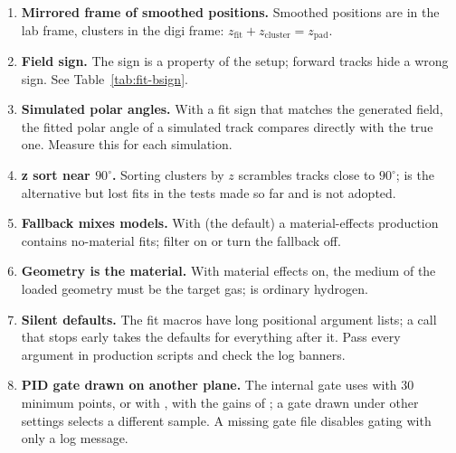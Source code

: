 \begin{enumerate}
\item \textbf{Mirrored frame of smoothed positions.} Smoothed positions are in the lab frame, clusters in the digi
  frame: $z_\mathrm{fit} + z_\mathrm{cluster} = z_\mathrm{pad}$.
\item \textbf{Field sign.} The sign is a property of the setup; forward tracks hide a wrong sign. See
  Table~\ref{tab:fit-bsign}.
\item \textbf{Simulated polar angles.} With a fit sign that matches the generated field, the fitted polar angle of a
  simulated track compares directly with the true one. Measure this for each simulation.
\item \textbf{z sort near $90^\circ$.} Sorting clusters by $z$ scrambles tracks close to $90^\circ$;
   is the alternative but lost fits in the tests made so far and is not adopted.
\item \textbf{Fallback mixes models.} With  (the default) a material-effects
  production contains no-material fits; filter on  or turn the fallback off.
\item \textbf{Geometry is the material.} With material effects on, the medium of the loaded geometry must be the target
  gas;  is ordinary hydrogen.
\item \textbf{Silent defaults.} The fit macros have long positional argument lists; a call that stops early takes the
  defaults for everything after it. Pass every argument in production scripts and check the log banners.
\item \textbf{PID gate drawn on another plane.} The internal gate uses  with 30 minimum points, or
   with , with the gains of ; a gate drawn under other settings
  selects a different sample. A missing gate file disables gating with only a log message.
\end{enumerate}
